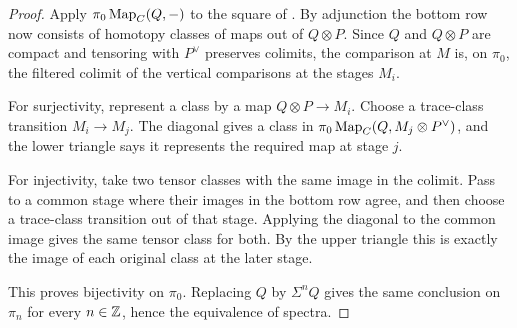 	\begin{proof}
		Apply $\pi_0\operatorname{Map}_C(Q,-)$ to the square of . By adjunction the bottom row now consists of homotopy classes of maps out of $Q\otimes P$. Since $Q$ and $Q\otimes P$ are compact and tensoring with $P^\vee$ preserves colimits, the comparison at $M$ is, on $\pi_0$, the filtered colimit of the vertical comparisons at the stages $M_i$.

		For surjectivity, represent a class by a map $Q\otimes P\to M_i$. Choose a trace-class transition $M_i\to M_j$. The diagonal gives a class in $\pi_0\operatorname{Map}_C(Q,M_j\otimes P^\vee)$, and the lower triangle says it represents the required map at stage $j$.

		For injectivity, take two tensor classes with the same image in the colimit. Pass to a common stage where their images in the bottom row agree, and then choose a trace-class transition out of that stage. Applying the diagonal to the common image gives the same tensor class for both. By the upper triangle this is exactly the image of each original class at the later stage.

		This proves bijectivity on $\pi_0$. Replacing $Q$ by $\Sigma^n Q$ gives the same conclusion on $\pi_n$ for every $n\in\operatorname{\mathbb Z}$, hence the equivalence of spectra.
	\end{proof}

